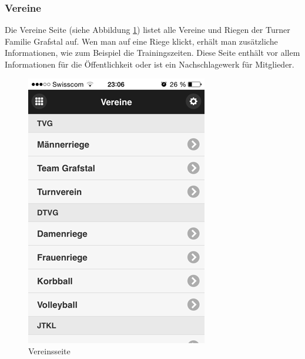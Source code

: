 \FloatBarrier
\subsubsection{Vereine}
Die Vereine Seite (siehe Abbildung \ref{fig:app_vereine})  listet alle Vereine und Riegen der Turner Familie Grafstal auf. Wen man auf eine Riege klickt, erhält man zusätzliche Informationen, wie zum Beispiel die Trainingszeiten. Diese Seite enthält vor allem Informationen für die Öffentlichkeit oder ist ein Nachschlagewerk für Mitglieder.


\begin{figure}[h]
\centering
\includegraphics[scale=0.5]{images/app/vereine.png}
\caption{Vereinsseite}
\label{fig:app_vereine}
\end{figure}

\newpage
\FloatBarrier
